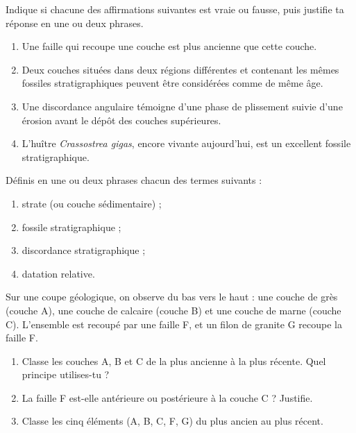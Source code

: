 \documentclass[11pt]{article}
\newcounter{popsec}
\newcounter{popsub}
\newcommand{\courssub}[1]{%
  \stepcounter{popsub}%
  \par\vspace{9pt}\noindent{\popxbold\fontsize{11.5}{13}\selectfont\color{popink}{\color{poporange}\thepopsec.\thepopsub}\hspace{6pt}#1}\par\nopagebreak\vspace{4pt}
}
\begin{document}
\begin{exercice}
Indique si chacune des affirmations suivantes est vraie ou fausse, puis justifie ta réponse en une ou deux phrases.
\begin{enumerate}
\item Une faille qui recoupe une couche est plus ancienne que cette couche.
\item Deux couches situées dans deux régions différentes et contenant les mêmes fossiles stratigraphiques peuvent être considérées comme de même âge.
\item Une discordance angulaire témoigne d'une phase de plissement suivie d'une érosion avant le dépôt des couches supérieures.
\item L'huître \emph{Crassostrea gigas}, encore vivante aujourd'hui, est un excellent fossile stratigraphique.
\end{enumerate}
\end{exercice}

\begin{exercice}[Définitions]
Définis en une ou deux phrases chacun des termes suivants :
\begin{enumerate}
\item strate (ou couche sédimentaire) ;
\item fossile stratigraphique ;
\item discordance stratigraphique ;
\item datation relative.
\end{enumerate}
\end{exercice}

\begin{exercice}
Sur une coupe géologique, on observe du bas vers le haut : une couche de grès (couche A), une couche de calcaire (couche B) et une couche de marne (couche C). L'ensemble est recoupé par une faille F, et un filon de granite G recoupe la faille F.
\begin{enumerate}
\item Classe les couches A, B et C de la plus ancienne à la plus récente. Quel principe utilises-tu ?
\item La faille F est-elle antérieure ou postérieure à la couche C ? Justifie.
\item Classe les cinq éléments (A, B, C, F, G) du plus ancien au plus récent.
\end{enumerate}
\end{exercice}

\courssub{Je m'entraîne}
\end{document}
